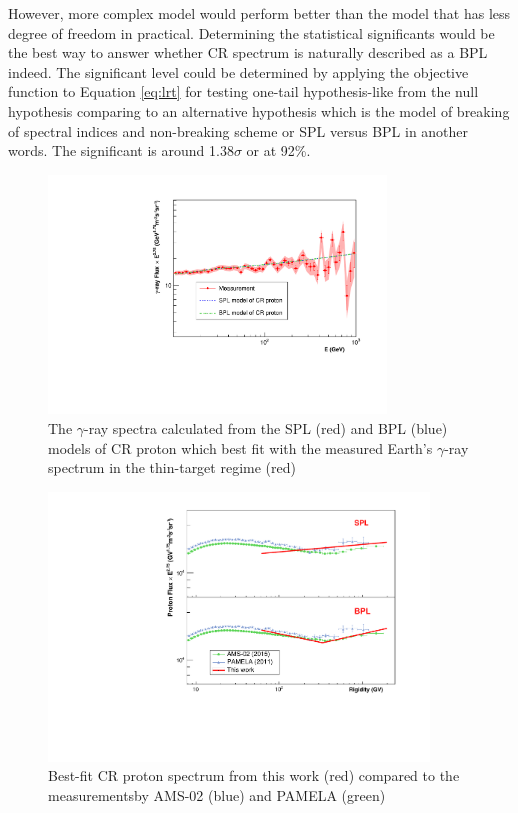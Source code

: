 However, more complex model would perform better than the model 
that has less degree of freedom in practical. Determining the 
statistical significants would be the best way to answer whether 
CR spectrum is naturally described as a BPL indeed.
The significant level could be determined by applying the objective function
to Equation \ref{eq:lrt} for testing one-tail hypothesis-like
from the null hypothesis comparing to an alternative
hypothesis which is the model of breaking of spectral indices
and non-breaking scheme or SPL versus BPL in another words.
The significant is around 1.38$\sigma$ or at 92\%.


\begin{figure}[h!]
    \centering
    \includegraphics[width=0.8\textwidth]{content/result_and_discussion/figures/fitted_result.pdf}
    \caption{
        The $\gamma$-ray spectra calculated from the SPL (red)
        and BPL (blue) models of CR proton which best fit with the
        measured Earth's $\gamma$-ray spectrum in the thin-target
        regime (red)
    }
    \label{fig:fitted_gamma_specgtrum}
\end{figure}

\newpage 

\begin{figure}[h!]
    \centering
    \includegraphics[width=0.9\textwidth]{content/result_and_discussion/figures/ProtonSpectrumModelMeasurement.pdf}
    \caption{
        Best-fit CR proton spectrum from this work (red)
        compared to the measurementsby AMS-02 (blue) and
        PAMELA (green)
    }
    \label{fig:fitted_cr_proton}
\end{figure}

